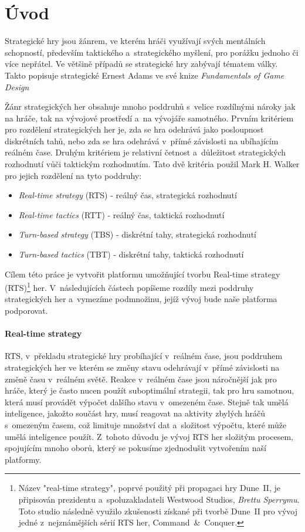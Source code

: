 \chapter{Úvod}

Strategické hry jsou žánrem, ve kterém hráči využívají svých mentálních schopností, především taktického a~strategického myšlení, pro porážku jednoho či více nepřátel. Ve většině případů se strategické hry zabývají tématem války. Takto popisuje strategické Ernest Adams ve své knize \textit{Fundamentals of Game Design}\citep[str.~419]{book:gamefund}

Žánr strategických her obsahuje mnoho poddruhů s~velice rozdílnými nároky jak na hráče, tak na vývojové prostředí a~na vývojáře samotného. Prvním kritériem pro rozdělení strategických her je, zda se hra odehrává jako posloupnost diskrétních tahů, nebo zda se hra odehrává v~přímé závislosti na ubíhajícím reálném čase. Druhým kritériem je relativní četnost a~důležitost strategických rozhodnutí vůči taktickým rozhodnutím. Tato dvě kritéria použil Mark H. Walker\citep{site:stratg05} pro jejich rozdělení na tyto poddruhy:
\begin{itemize}
	\item \emph{Real-time strategy} (RTS) - reálný čas, strategická rozhodnutí
	\item \emph{Real-time tactics} (RTT) - reálný čas, taktická rozhodnutí
	\item \emph{Turn-based strategy} (TBS) - diskrétní tahy, strategická rozhodnutí
	\item \emph{Turn-based tactics} (TBT) - diskrétní tahy, taktická rozhodnutí
\end{itemize}

Cílem této práce je vytvořit platformu umožňující tvorbu Real-time strategy (RTS)\footnote{Název "real-time strategy", poprvé použitý při propagaci hry Dune~II\citep{site:dune2}, je připisován prezidentu a~spoluzakladateli Westwood Studios\citep{site:westwood}, \emph{Brettu Sperrymu}. Toto studio následně využilo zkušenosti získané při tvorbě Dune~II pro vývoj jedné z~nejznámějších sérií RTS her, Command~\&~Conquer\citep{site:cmdcnq}.} her. V~následujících částech popíšeme rozdíly mezi poddruhy strategických her a~vymezíme podmnožinu, jejíž vývoj bude naše platforma podporovat. 

\subsubsection{Real-time strategy}
 RTS, v~překladu strategické hry probíhající v~reálném čase, jsou poddruhem strategických her ve kterém se změny stavu odehrávají v~přímé závislosti na změně času v~reálném světě. Reakce v~reálném čase jsou náročnější jak pro hráče, který je často nucen použít suboptimální strategii, tak pro hru samotnou, která musí provádět výpočet dalšího stavu v~omezeném čase. Stejně tak umělá inteligence, jakožto součást hry, musí reagovat na aktivity zbylých hráčů s~omezeným časem, což limituje množství dat a~složitost výpočtu, které může umělá inteligence použít. Z~tohoto důvodu je vývoj RTS her složitým procesem, spojujícím mnoho oborů, který se pokusíme zjednodušit vytvořením naší platformy.

